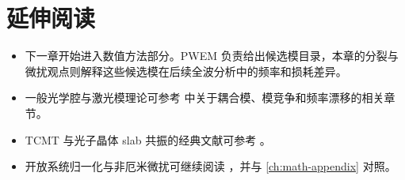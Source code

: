 \section*{延伸阅读}
\begin{itemize}
  \item 下一章开始进入数值方法部分。PWEM 负责给出候选模目录，本章的分裂与微扰观点则解释这些候选模在后续全波分析中的频率和损耗差异。

  \item 一般光学腔与激光模理论可参考 \cite{siegman1986,coldren2012} 中关于耦合模、模竞争和频率漂移的相关章节。

  \item TCMT 与光子晶体 slab 共振的经典文献可参考 \cite{fan2002guided,fan2003fano,suh2004tcmt}。

  \item 开放系统归一化与非厄米微扰可继续阅读 \cite{leung1994perturb,muljarov2010bw,sauvan2013qnm,kristensen2015qnm}，并与 \cref{ch:math-appendix} 对照。
\end{itemize}
